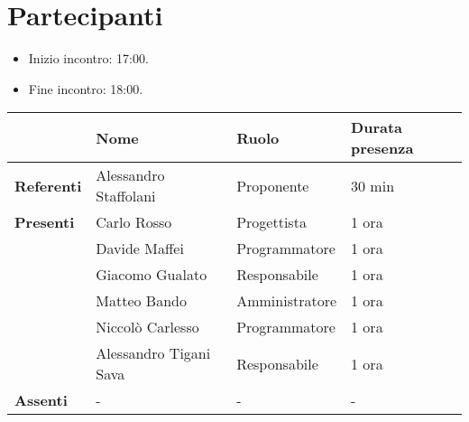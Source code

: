 \section*{Partecipanti}

\begin{itemize}
	\item Inizio incontro: 17:00.
	\item Fine incontro: 18:00.
\end{itemize}


\begin{center}
	{\renewcommand{\arraystretch}{1.5}
		\begin{tabular}{l|lll}
			                   	& \textbf{Nome}          & \textbf{Ruolo}  & \textbf{Durata presenza} \\
			\hline
			\textbf{Referenti} 	& Alessandro Staffolani  	& Proponente		& 30 min	\\
			\hline
			\textbf{Presenti} 	& Carlo Rosso            	& Progettista    	& 1 ora	\\
								& Davide Maffei          	& Programmatore   	& 1 ora	\\
								& Giacomo Gualato			& Responsabile		& 1 ora \\
								& Matteo Bando           	& Amministratore 	& 1 ora	\\
								& Niccolò Carlesso       	& Programmatore  	& 1 ora	\\
								& Alessandro Tigani Sava 	& Responsabile  	& 1 ora	\\
			\hline
			\textbf{Assenti}	& -							& -					& -		\\
		\end{tabular}
	}
\end{center}
